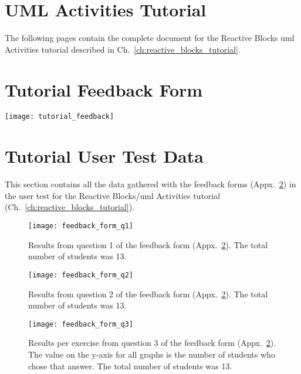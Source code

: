 \begin{appendices}

\chapter{UML Activities Tutorial}
\label{appx:tutorial}
The following pages contain the complete document for the Reactive Blocks \gls{uml} Activities tutorial described in Ch.~\ref{ch:reactive_blocks_tutorial}.


\chapter{Tutorial Feedback Form}
\label{appx:feedback_form}

\texttt{[image: tutorial\_feedback]}

\chapter{Tutorial User Test Data}
\label{appx:tutorial_test_data}
This section contains all the data gathered with the feedback forms (Appx.~\ref{appx:feedback_form}) in the user test for the Reactive Blocks/\gls{uml} Activities tutorial (Ch.~\ref{ch:reactive_blocks_tutorial}).

\begin{figure}[htp]
	\centering
	\texttt{[image: feedback\_form\_q1]}
	\caption[Results from feedback form question 1]{Results from question 1 of the feedback form (Appx.~\ref{appx:feedback_form}). The total number of students was 13.}
	\label{fig:feedback_form_q1}
\end{figure}

\begin{figure}[htp]
	\centering
	\texttt{[image: feedback\_form\_q2]}
	\caption[Results from feedback form question 2]{Results from question 2 of the feedback form (Appx.~\ref{appx:feedback_form}). The total number of students was 13.}
	\label{fig:feedback_form_q2}
\end{figure}

\begin{figure}[htp]
	\centering
	\texttt{[image: feedback\_form\_q3]}
	\caption[Results from feedback form question 3]{Results per exercise from question 3 of the feedback form (Appx.~\ref{appx:feedback_form}). The value on the y-axis for all graphs is the number of students who chose that answer. The total number of students was 13.}
	\label{fig:feedback_form_q3}
\end{figure}


\end{appendices}
